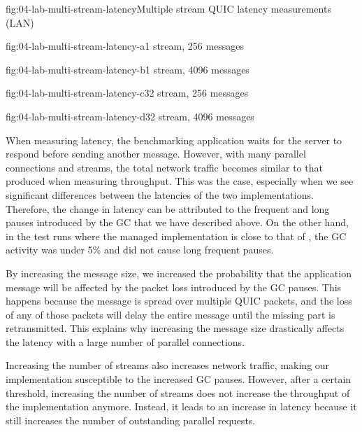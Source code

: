 \begin{myFigure}{fig:04-lab-multi-stream-latency}{Multiple stream QUIC latency measurements (LAN)}
\begin{mySubfigure}{0.49\linewidth}{fig:04-lab-multi-stream-latency-a}{1 stream, \SI{256}{\byte} messages}
\footnotesize

\end{mySubfigure}
\begin{mySubfigure}{0.49\linewidth}{fig:04-lab-multi-stream-latency-b}{1 stream, \SI{4096}{\byte} messages}
\footnotesize

\end{mySubfigure}

\begin{mySubfigure}{0.49\linewidth}{fig:04-lab-multi-stream-latency-c}{32 stream, \SI{256}{\byte} messages}
\footnotesize

\end{mySubfigure}
\begin{mySubfigure}{0.49\linewidth}{fig:04-lab-multi-stream-latency-d}{32 stream, \SI{4096}{\byte} messages}
\footnotesize

\end{mySubfigure}
\end{myFigure}

When measuring latency, the benchmarking application waits for the server to respond before sending
another message. However, with many parallel connections and streams, the total network traffic
becomes similar to that produced when measuring throughput. This was the case, especially when we
see significant differences between the latencies of the two implementations. Therefore, the change
in latency can be attributed to the frequent and long pauses introduced by the GC that we have
described above. On the other hand, in the test runs where the managed implementation is close to
that of \libmsquic{}, the GC activity was under 5\% and did not cause long frequent pauses.

By increasing the message size, we increased the probability that the application message will be
affected by the packet loss introduced by the GC pauses. This happens because the message is spread
over multiple QUIC packets, and the loss of any of those packets will delay the entire message until
the missing part is retransmitted. This explains why increasing the message size drastically affects
the latency with a large number of parallel connections.

Increasing the number of streams also increases network traffic, making our implementation
susceptible to the increased GC pauses. However, after a certain threshold, increasing the number of
streams does not increase the throughput of the implementation anymore. Instead, it leads to an
increase in latency because it still increases the number of outstanding parallel requests.

